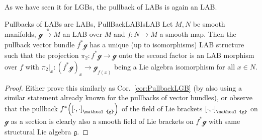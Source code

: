 \documentclass[a4paper,oneside,11pt,bibliography=totoc]{scrartcl}
\def\bas#1\eas{\begin{align*}#1\end{align*}}
\theoremstyle{plain}
\theoremstyle{remark}
\theoremstyle{definition}
\begin{document}
%
%

As we have seen it for LGBs, the pullback of LABs is again an LAB.

\begin{corollaries}{Pullbacks of LABs are LABs, \cite[\S 3, Thm.\ 3.2]{PullbackLGBLAB}}{PullBackLABIsLAB}
Let $M, N$ be smooth manifolds, $\mathcal{g} \stackrel{\pi}{\to} M$ an LAB over $M$ and $f: N \to M$ a smooth map. Then the pullback vector bundle $f^*\mathcal{g}$ has a unique (up to isomorphisms) LAB structure such that the projection $\pi_2: f^*\mathcal{g} \to \mathcal{g}$ onto the second factor is an LAB morphism over $f$ with $\pi_2|_x: (f^*\mathcal{g})_x \to \mathcal{g}_{f(x)}$ being a Lie algebra isomorphism for all $x \in N$.
%
\end{corollaries}

\begin{proof}
\leavevmode\newline
Either prove this similarly as Cor.\ \ref{cor:PullbackLGB} (by also using a similar statement already known for the pullbacks of vector bundles), or observe that the pullback $f^*\mleft(\mleft[ \cdot, \cdot \mright]_{\mathcal{g}}\mright)$ of the field of Lie brackets $\mleft[ \cdot, \cdot \mright]_{\mathcal{g}}$ on $\mathcal{g}$ as a section is clearly also a smooth field of Lie brackets on $f^*\mathcal{g}$ with same structural Lie algebra $\mathfrak{g}$.
\end{proof}
\end{document}
